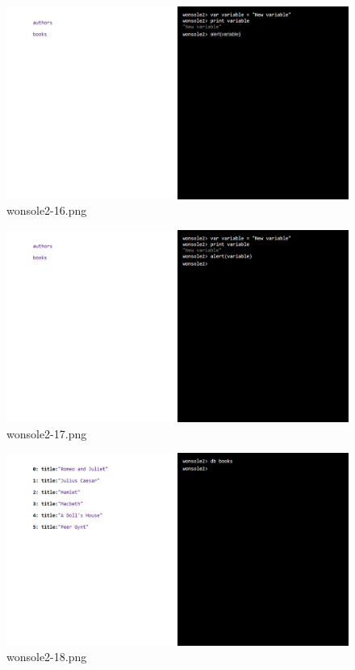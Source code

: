 \begin{figure}
\includegraphics[width=\textwidth]{screenshot/wonsole2/wonsole2-16.png}
\caption{wonsole2-16.png}
\label{wonsole2-16.png}
\end{figure}


\clearpage
\begin{figure}
\includegraphics[width=\textwidth]{screenshot/wonsole2/wonsole2-17.png}
\caption{wonsole2-17.png}
\label{wonsole2-17.png}
\end{figure}


\begin{figure}
\includegraphics[width=\textwidth]{screenshot/wonsole2/wonsole2-18.png}
\caption{wonsole2-18.png}
\label{wonsole2-18.png}
\end{figure}


